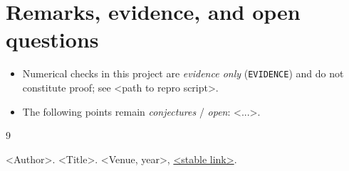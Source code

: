 \documentclass{amsart}
\theoremstyle{definition}
\begin{document}
\section{Remarks, evidence, and open questions}
\label{sec:remarks}

\begin{itemize}
\item Numerical checks in this project are \emph{evidence only}
(\texttt{EVIDENCE}) and do not constitute proof; see <path to repro script>.
\item The following points remain \emph{conjectures} / \emph{open}: <...>.
\end{itemize}


\begin{thebibliography}{9}

<Author>. <Title>. <Venue, year>, \href{<doi or arxiv url>}{<stable link>}.

\end{thebibliography}
\end{document}

